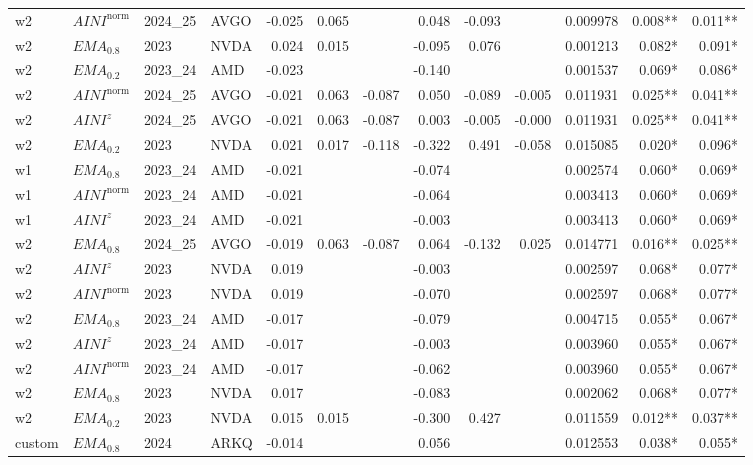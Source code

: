 \begin{longtable}{@{}llllrrrrrrrrr@{}}
w2 & $AINI^{\mathrm{norm}}$ & 2024\_25 & AVGO & -0.025 & 0.065 &  & 0.048 & -0.093 &  & 0.009978 & 0.008** & 0.011** \\
w2 & $EMA_{0.8}$ & 2023 & NVDA & 0.024 & 0.015 &  & -0.095 & 0.076 &  & 0.001213 & 0.082* & 0.091* \\
w2 & $EMA_{0.2}$ & 2023\_24 & AMD & -0.023 &  &  & -0.140 &  &  & 0.001537 & 0.069* & 0.086* \\
w2 & $AINI^{\mathrm{norm}}$ & 2024\_25 & AVGO & -0.021 & 0.063 & -0.087 & 0.050 & -0.089 & -0.005 & 0.011931 & 0.025** & 0.041** \\
w2 & $AINI^{z}$ & 2024\_25 & AVGO & -0.021 & 0.063 & -0.087 & 0.003 & -0.005 & -0.000 & 0.011931 & 0.025** & 0.041** \\
w2 & $EMA_{0.2}$ & 2023 & NVDA & 0.021 & 0.017 & -0.118 & -0.322 & 0.491 & -0.058 & 0.015085 & 0.020* & 0.096* \\
w1 & $EMA_{0.8}$ & 2023\_24 & AMD & -0.021 &  &  & -0.074 &  &  & 0.002574 & 0.060* & 0.069* \\
w1 & $AINI^{\mathrm{norm}}$ & 2023\_24 & AMD & -0.021 &  &  & -0.064 &  &  & 0.003413 & 0.060* & 0.069* \\
w1 & $AINI^{z}$ & 2023\_24 & AMD & -0.021 &  &  & -0.003 &  &  & 0.003413 & 0.060* & 0.069* \\
w2 & $EMA_{0.8}$ & 2024\_25 & AVGO & -0.019 & 0.063 & -0.087 & 0.064 & -0.132 & 0.025 & 0.014771 & 0.016** & 0.025** \\
w2 & $AINI^{z}$ & 2023 & NVDA & 0.019 &  &  & -0.003 &  &  & 0.002597 & 0.068* & 0.077* \\
w2 & $AINI^{\mathrm{norm}}$ & 2023 & NVDA & 0.019 &  &  & -0.070 &  &  & 0.002597 & 0.068* & 0.077* \\
w2 & $EMA_{0.8}$ & 2023\_24 & AMD & -0.017 &  &  & -0.079 &  &  & 0.004715 & 0.055* & 0.067* \\
w2 & $AINI^{z}$ & 2023\_24 & AMD & -0.017 &  &  & -0.003 &  &  & 0.003960 & 0.055* & 0.067* \\
w2 & $AINI^{\mathrm{norm}}$ & 2023\_24 & AMD & -0.017 &  &  & -0.062 &  &  & 0.003960 & 0.055* & 0.067* \\
w2 & $EMA_{0.8}$ & 2023 & NVDA & 0.017 &  &  & -0.083 &  &  & 0.002062 & 0.068* & 0.077* \\
w2 & $EMA_{0.2}$ & 2023 & NVDA & 0.015 & 0.015 &  & -0.300 & 0.427 &  & 0.011559 & 0.012** & 0.037** \\
custom & $EMA_{0.8}$ & 2024 & ARKQ & -0.014 &  &  & 0.056 &  &  & 0.012553 & 0.038* & 0.055* \\

\end{longtable}
